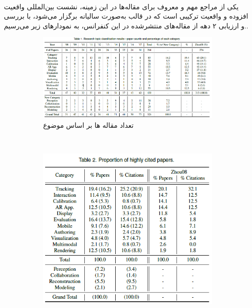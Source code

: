 \\
یکی از مراجع مهم و معروف برای مقاله‌ها در این زمینه، نشست بین‌المللی واقعیت افزوده و واقعیت ترکیبی  است که در قالب  به‌صورت سالیانه برگزار می‌شود، با بررسی و ارزیابی ۲ دهه از مقاله‌های منتشرشده در این کنفرانس، به نمودارهای زیر می‌رسیم.‌\cite{ismar}.
\begin{figure}
	\centering
	\begin{subfigure}[b]{1\textwidth}
		\includegraphics[width=\textwidth]{image/ismar1}
		\caption{تعداد مقاله ها بر اساس موضوع}
		\label{fig:gull}
	\end{subfigure}
	~ %
	\begin{subfigure}[b]{0.4\textwidth}
		\includegraphics[width=\textwidth]{image/ismar2}

\end{subfigure}
\end{figure}
